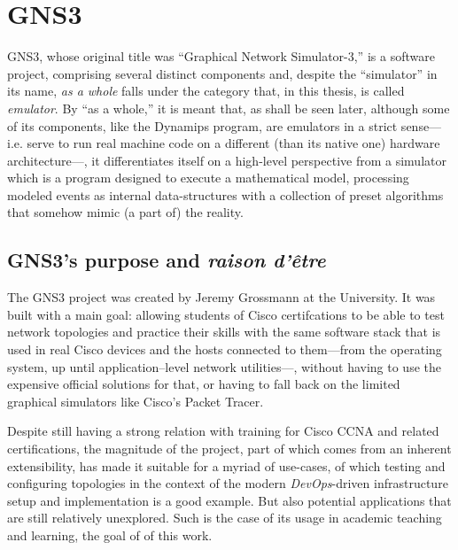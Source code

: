 
\chapter{GNS3}
\label{ch:gns3}

GNS3, whose original title was ``Graphical Network Simulator-3,'' is a software project, comprising several distinct components and, despite the ``simulator'' in its name, \emph{as a whole} falls under the category that, in this thesis, is called \emph{emulator}.
By ``as a whole,'' it is meant that, as shall be seen later, although some of its components, like the Dynamips program, are emulators in a strict sense---i.e. serve to run real machine code on a different (than its native one) hardware architecture---, it differentiates itself on a high-level perspective from a simulator which is a program designed to execute a mathematical model, processing modeled events as internal data-structures with a collection of preset algorithms that somehow mimic (a part of) the reality.


\section{GNS3's purpose and \emph{raison d'être}}
\label{sec:gns3why}

The GNS3 project was created by Jeremy Grossmann at the University.
It was built with a main goal: allowing students of Cisco certifcations to be able to test network topologies and practice their skills with the same software stack that is used in real Cisco devices and the hosts connected to them---from the operating system, up until application--level network utilities---, without having to use the expensive official solutions for that, or having to fall back on the limited graphical simulators like Cisco's Packet Tracer.

Despite still having a strong relation with training for Cisco CCNA and related certifications, the magnitude of the project, part of which comes from an inherent extensibility, has made it suitable for a myriad of use-cases, of which testing and configuring topologies in the context of the modern \emph{DevOps}-driven infrastructure setup and implementation is a good example.
But also potential applications that are still relatively unexplored.
Such is the case of its usage in academic teaching and learning, the goal of of this work.

